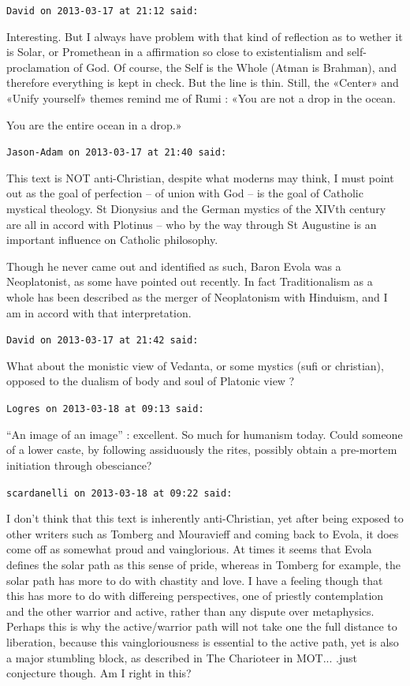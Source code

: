 \begin{footnotesize}
\begin{sffamily}
\texttt{David on 2013-03-17 at 21:12 said:}

Interesting. But I always have problem with that kind of reflection as to wether it is Solar, or Promethean in a affirmation so close to existentialism and self-proclamation of God. Of course, the Self is the Whole (Atman is Brahman), and therefore everything is kept in check. But the line is thin. Still, the «Center» and «Unify yourself» themes remind me of Rumi : «You are not a drop in the ocean.

You are the entire ocean in a drop.»

\hfill

\texttt{Jason-Adam on 2013-03-17 at 21:40 said:}

This text is NOT anti-Christian, despite what moderns may think, I must point out as the goal of perfection -- of union with God -- is the goal of Catholic mystical theology. St Dionysius and the German mystics of the XIVth century are all in accord with Plotinus -- who by the way through St Augustine is an important influence on Catholic philosophy.

Though he never came out and identified as such, Baron Evola was a Neoplatonist, as some have pointed out recently. In fact Traditionalism as a whole has been described as the merger of Neoplatonism with Hinduism, and I am in accord with that interpretation.

\hfill

\texttt{David on 2013-03-17 at 21:42 said:}

What about the monistic view of Vedanta, or some mystics (sufi or christian), opposed to the dualism of body and soul of Platonic view ?

\hfill

\texttt{Logres on 2013-03-18 at 09:13 said:}

``An image of an image'' : excellent. So much for humanism today. Could someone of a lower caste, by following assiduously the rites, possibly obtain a pre-mortem initiation through obesciance?

\hfill

\texttt{scardanelli on 2013-03-18 at 09:22 said:}

I don't think that this text is inherently anti-Christian, yet after being exposed to other writers such as Tomberg and Mouravieff and coming back to Evola, it does come off as somewhat proud and vainglorious. At times it seems that Evola defines the solar path as this sense of pride, whereas in Tomberg for example, the solar path has more to do with chastity and love. I have a feeling though that this has more to do with differeing perspectives, one of priestly contemplation and the other warrior and active, rather than any dispute over metaphysics. Perhaps this is why the active/warrior path will not take one the full distance to liberation, because this vaingloriousness is essential to the active path, yet is also a major stumbling block, as described in The Charioteer in MOT... .just conjecture though. Am I right in this?


\end{sffamily}
\end{footnotesize}
